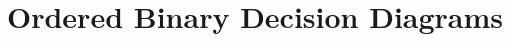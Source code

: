 \newenvironment{boxfig}[2]{\begin{figure}[#1]\fbox{\begin{minipage}{0.97\linewidth}
                        \vspace{0.2em}
                        \makebox[0.02\linewidth]{}
                        \begin{minipage}{0.94\linewidth}
            {\small{
                        #2 }}
                        \end{minipage}
                        \vspace{0.2em}
                        \end{minipage}}}{\end{figure}}

\newenvironment{boxfig*}[2]{\begin{figure*}[#1]\fbox{\begin{minipage}{0.97\linewidth}
                        \vspace{0.2em}
                        \makebox[0.02\linewidth]{}
                        \begin{minipage}{0.94\linewidth}
            {\small{
                        #2 }}
                        \end{minipage}
                        \vspace{0.2em}
                        \end{minipage}}}{\end{figure*}}


\newcommand{\alg}[1]{\ensuremath{\mathsf{#1}}}

\newcommand{\binset}{\{0,1\}}
\newcommand{\rfrom}{\ensuremath{\stackrel{\mathrm{R}}{\gets}}}
\newcommand{\from}{\ensuremath{{\gets}}}

\chapter{Ordered Binary Decision Diagrams}
\label{chapter:obdd}





%

\begin{comment}
 


\appendix


\end{comment}
